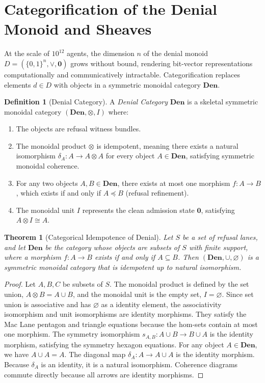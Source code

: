 \documentclass[11pt,oneside]{book}
\theoremstyle{definition}
\newtheorem{definition}{Definition}[chapter]
\theoremstyle{plain}
\newtheorem{theorem}{Theorem}[chapter]
\theoremstyle{remark}
\begin{document}
\section{Categorification of the Denial Monoid and Sheaves}
At the scale of $10^{12}$ agents, the dimension $n$ of the denial monoid $D = (\{0,1\}^n, \lor, \mathbf{0})$ grows without bound, rendering bit-vector representations computationally and communicatively intractable. %
Categorification replaces elements $d \in D$ with objects in a symmetric monoidal category $\mathbf{Den}$. %

\begin{definition}[Denial Category]\label{def:denial_cat}
A \emph{Denial Category} $\mathbf{Den}$ is a skeletal symmetric monoidal category $(\mathbf{Den}, \otimes, I)$ where: %
\begin{enumerate}
\item The objects are refusal witness bundles. %
\item The monoidal product $\otimes$ is idempotent, meaning there exists a natural isomorphism $\delta_A: A \to A \otimes A$ for every object $A \in \mathbf{Den}$, satisfying symmetric monoidal coherence. %
\item For any two objects $A, B \in \mathbf{Den}$, there exists at most one morphism $f: A \to B$, which exists if and only if $A \preceq B$ (refusal refinement). %
\item The monoidal unit $I$ represents the clean admission state $\mathbf{0}$, satisfying $A \otimes I \cong A$. %
\end{enumerate}
\end{definition}

\begin{theorem}[Categorical Idempotence of Denial]\label{thm:cat_idempotence}
Let $S$ be a set of refusal lanes, and let $\mathbf{Den}$ be the category whose objects are subsets of $S$ with finite support, where a morphism $f: A \to B$ exists if and only if $A \subseteq B$. %
Then $(\mathbf{Den}, \cup, \varnothing)$ is a symmetric monoidal category that is idempotent up to natural isomorphism. %
\end{theorem}

\begin{proof}
Let $A, B, C$ be subsets of $S$. %
The monoidal product is defined by the set union, $A \otimes B = A \cup B$, and the monoidal unit is the empty set, $I = \varnothing$. %
Since set union is associative and has $\varnothing$ as a identity element, the associativity isomorphism and unit isomorphisms are identity morphisms. %
They satisfy the Mac Lane pentagon \cite{maclane1963} and triangle equations because the hom-sets contain at most one morphism. %
The symmetry isomorphism $s_{A,B}: A \cup B \to B \cup A$ is the identity morphism, satisfying the symmetry hexagon equations. %
For any object $A \in \mathbf{Den}$, we have $A \cup A = A$. %
The diagonal map $\delta_A: A \to A \cup A$ is the identity morphism. %
Because $\delta_A$ is an identity, it is a natural isomorphism. %
Coherence diagrams commute directly because all arrows are identity morphisms. %
\end{proof}
\end{document}
